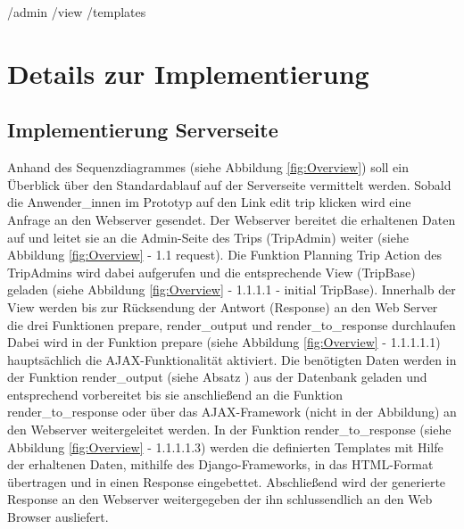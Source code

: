 \documentclass[Bachelorarbeit.tex]{subfiles}
\begin{document}
/admin
/view
/templates
\section{Details zur Implementierung}
\label{chap:implementierung:sec:details}

\subsection{Implementierung Serverseite}
\label{implServer}
Anhand des Sequenzdiagrammes (siehe Abbildung \ref{fig:Overview}) soll ein  Überblick über den Standardablauf auf der Serverseite vermittelt werden. 
Sobald die Anwender\_innen im  Prototyp auf den Link edit trip klicken wird eine  Anfrage an den Webserver gesendet.
Der Webserver bereitet die erhaltenen Daten auf und leitet sie an die Admin-Seite des Trips (TripAdmin) weiter (siehe Abbildung \ref{fig:Overview} - 1.1 request). 
Die Funktion Planning Trip Action des TripAdmins wird dabei aufgerufen und die entsprechende View (TripBase) geladen (siehe Abbildung \ref{fig:Overview} - 1.1.1.1 - initial TripBase).
Innerhalb der View werden bis zur Rücksendung der Antwort (Response) an den Web Server die drei Funktionen prepare, render\_output und render\_to\_response durchlaufen
Dabei wird in der Funktion prepare (siehe Abbildung \ref{fig:Overview} - 1.1.1.1.1) hauptsächlich die \ac{AJAX}-Funktionalität aktiviert.
Die benötigten Daten werden in der Funktion render\_output (siehe Absatz ) aus der Datenbank geladen und entsprechend vorbereitet bis sie anschließend an die Funktion render\_to\_response oder über das \ac{AJAX}-Framework (nicht in der Abbildung) an den Webserver weitergeleitet werden.
In der Funktion render\_to\_response (siehe Abbildung \ref{fig:Overview} - 1.1.1.1.3) werden die definierten Templates mit Hilfe der erhaltenen Daten, mithilfe des Django-Frameworks, in das \ac{HTML}-Format übertragen und in einen Response eingebettet.
Abschließend wird der generierte Response an den Webserver weitergegeben der ihn schlussendlich an den Web Browser ausliefert.
\end{document}
